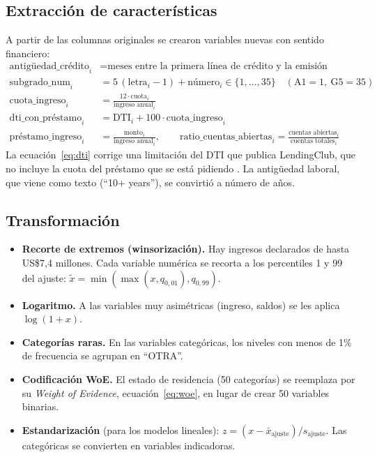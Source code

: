 \documentclass{article}
\begin{document}
\subsection{Extracción de características}
A partir de las columnas originales se crearon variables nuevas con sentido
financiero:
\begin{align}
\text{antigüedad\_crédito}_i &= \text{meses entre la primera línea de crédito y la emisión} \\
\text{subgrado\_num}_i &= 5\,(\text{letra}_i - 1) + \text{número}_i \in \{1,\dots,35\} \quad (\text{A1}=1,\ \text{G5}=35)\\
\text{cuota\_ingreso}_i &= \frac{12 \cdot \text{cuota}_i}{\text{ingreso anual}_i} \\
\text{dti\_con\_préstamo}_i &= \text{DTI}_i + 100 \cdot \text{cuota\_ingreso}_i \label{eq:dti}\\
\text{préstamo\_ingreso}_i &= \frac{\text{monto}_i}{\text{ingreso anual}_i}, \qquad
\text{ratio\_cuentas\_abiertas}_i = \frac{\text{cuentas abiertas}_i}{\text{cuentas totales}_i}
\end{align}
La ecuación~\eqref{eq:dti} corrige una limitación del DTI que publica LendingClub,
que no incluye la cuota del préstamo que se está pidiendo \cite{namvar2018}. La
antigüedad laboral, que viene como texto (``10+ years''), se convirtió a número
de años.

\subsection{Transformación}
\begin{itemize}
  \item \textbf{Recorte de extremos (winsorización).} Hay ingresos declarados de
        hasta US\$7,4 millones. Cada variable numérica se recorta a los
        percentiles 1 y 99 del ajuste: $\tilde{x} = \min(\max(x, q_{0,01}), q_{0,99})$.
  \item \textbf{Logaritmo.} A las variables muy asimétricas (ingreso, saldos) se
        les aplica $\log(1+x)$.
  \item \textbf{Categorías raras.} En las variables categóricas, los niveles con
        menos de 1\% de frecuencia se agrupan en ``OTRA''.
  \item \textbf{Codificación WoE.} El estado de residencia (50 categorías) se
        reemplaza por su \emph{Weight of Evidence}, ecuación~\eqref{eq:woe}, en
        lugar de crear 50 variables binarias.
  \item \textbf{Estandarización} (para los modelos lineales):
        $z = (x - \bar{x}_{\text{ajuste}}) / s_{\text{ajuste}}$. Las
        categóricas se convierten en variables indicadoras.
\end{itemize}
\end{document}
